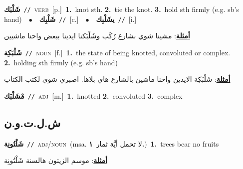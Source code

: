 \documentclass[10pt,a4paper,twoside]{article} %
\begin{document}
\begin{multicols}{2}
{\setlength\topsep{0pt}\textbf{\foreignlanguage{arabic}{شَلْبَك}}\ {\color{gray}\texttt{//}\color{black}}\ \textsc{verb}\ [p.]\ \textbf{1.}~knot sth.  \textbf{2.}~tie the knot.  \textbf{3.}~hold sth firmly (e.g. sb's hand)\ \ $\bullet$\ \ \setlength\topsep{0pt}\textbf{\foreignlanguage{arabic}{شَلْبِك}}\ {\color{gray}\texttt{//}\color{black}}\ [c.]\ \ $\bullet$\ \ \setlength\topsep{0pt}\textbf{\foreignlanguage{arabic}{يشَلْبِك}}\ {\color{gray}\texttt{//}\color{black}}\ [i.]\  \begin{flushright}\color{gray}\foreignlanguage{arabic}{\textbf{\underline{\foreignlanguage{arabic}{أمثلة}}}: مشينا شوي بشارع رٌكَب وشَلْبَكنا ايدينا ببعض واحنا ماشيين}\end{flushright}\color{black}} \vspace{2mm}

{\setlength\topsep{0pt}\textbf{\foreignlanguage{arabic}{شَلْبَكِة}}\ {\color{gray}\texttt{//}\color{black}}\ \textsc{noun}\ [f.]\ \textbf{1.}~the state of being knotted, convoluted or complex.  \textbf{2.}~holding sth firmly (e.g. sb's hand)\  \begin{flushright}\color{gray}\foreignlanguage{arabic}{\textbf{\underline{\foreignlanguage{arabic}{أمثلة}}}: شَلْبَكِة الايدين واحنا ماشين بالشارع هاي بلاها. اصبري شوي لكتب الكتاب}\end{flushright}\color{black}} \vspace{2mm}

{\setlength\topsep{0pt}\textbf{\foreignlanguage{arabic}{مْشَلْبَك}}\ {\color{gray}\texttt{//}\color{black}}\ \textsc{adj}\ [m.]\ \textbf{1.}~knotted  \textbf{2.}~convoluted  \textbf{3.}~complex\ } \vspace{2mm}

\vspace{-3mm}
\subsection*{\color{blue}\foreignlanguage{arabic}{ش.ل.ت.و.ن}\color{blue}{ (ntws)}} 

{\setlength\topsep{0pt}\textbf{\foreignlanguage{arabic}{شَلْتُونِة}}\ {\color{gray}\texttt{//}\color{black}}\ \textsc{adj/noun}\ \color{gray}(msa. \foreignlanguage{arabic}{لا تحمل أيَّة ثمار}~\foreignlanguage{arabic}{\textbf{١.}})\color{black}\ \textbf{1.}~trees bear no fruits\  \begin{flushright}\color{gray}\foreignlanguage{arabic}{\textbf{\underline{\foreignlanguage{arabic}{أمثلة}}}: موسم الزيتون هالسنة شَلْتُونِة}\end{flushright}\color{black}} \vspace{2mm}


\end{multicols}
\end{document}
